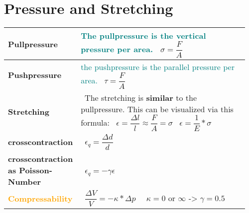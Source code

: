 \documentclass[main.tex,fontsize=8pt,paper=a4,paper=portrait,DIV=calc,]{scrartcl}
\begin{document}
\begin{table}[ht!]
\section{Pressure and Stretching}
\begin{tabular}{|m{0.2\linewidth}|m{0.755\linewidth}|}
\hline
\textbf{Pullpressure} & 
\textcolor{teal}{The pullpressure is the vertical pressure per area.}\newline
\, \newline
\large \( \sigma = \dfrac{F}{A} \)\newline
\normalsize \\
\hline
\textbf{Pushpressure} & 
\textcolor{teal}{the pushpressure is the parallel pressure per area.}\newline
\, \newline
\large \( \tau = \dfrac{F}{A} \)\newline
\normalsize \\
\hline
\textbf{Stretching} & 
\, \newline
The stretching is \textbf{similar} to the pullpressure.\newline
This can be visualized via this formula:\newline
\, \newline
\large \( \epsilon = \dfrac{\Delta l}{l} \approx \dfrac{F}{A} = \sigma \)\newline
\, \newline
\large \( \epsilon = \dfrac{1}{E} * \sigma \)
\, \newline
\normalsize \\
\hline
\textbf{crosscontraction} &
\, \newline
\large \( \epsilon_q = \dfrac{\Delta d}{d} \)
\, \newline
\normalsize \\
\hline
\textbf{crosscontraction as Poisson-Number} &
\, \newline
\large \( \epsilon_q = -\gamma \epsilon \)
\, \newline
\normalsize \\
\hline
\textbf{\textcolor{orange}{Compressability}} &
\, \newline
\large \( \dfrac{\Delta V}{V} = - \kappa * \Delta p  \)
\, \newline
\, \newline
\large \( \kappa = 0 \text{ or } \infty \text{ -> } \gamma = 0.5  \)
\, \newline
\normalsize \\
\hline
\end{tabular}
\end{table}
\pagebreak
\begin{table}[ht!]
\section{}
\begin{tabular}{|m{0.2\linewidth}|m{0.755\linewidth}|}
\hline

\hline
\end{tabular}
\end{table}
\end{document}

